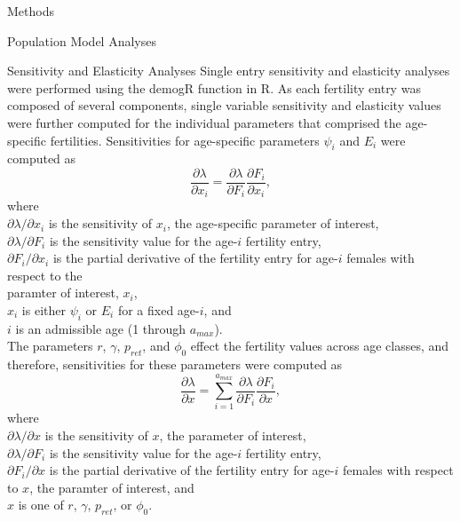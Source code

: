 \documentclass[12pt]{article}
\begin{document}
\begin{section}{Methods}
\begin{subsection}{Population Model Analyses}
\begin{subsubsection}{Sensitivity and Elasticity Analyses} 
Single entry sensitivity and elasticity analyses were performed using the demogR function in R.  As each fertility entry was composed of several components, single variable sensitivity and elasticity values were further computed for the individual parameters that comprised the age-specific fertilities.  Sensitivities for age-specific parameters $\psi_i$ and $E_i$ were computed as
\begin{equation}
\frac{\partial\lambda}{\partial x_i}=\frac{\partial\lambda}{\partial F_i}\frac{\partial F_i}{\partial x_i},
\end{equation} 
where\\
\hspace*{0.5cm}$\partial\lambda/\partial x_i$ is the sensitivity of $x_i$, the age-specific parameter of interest,\\
\hspace*{0.5cm}$\partial\lambda/\partial F_i$ is the sensitivity value for the age-$i$ fertility entry,\\
\hspace*{0.5cm}$\partial F_i/\partial x_i$ is the partial derivative of the fertility entry for age-$i$ females with respect to the\\ 
\hspace*{1.5cm}paramter of interest, $x_i$,\\
\hspace*{0.5cm}$x_i$ is either $\psi_i$ or $E_i$ for a fixed age-$i$, and\\
\hspace*{0.5cm}$i$ is an admissible age (1 through $a_{max}$).\\
 
The parameters $r$, $\gamma$, $p_{ret}$, and $\phi_0$ effect the fertility values across age classes, and therefore, sensitivities for these parameters were computed as
\begin{equation}
\frac{\partial\lambda}{\partial x}=\sum_{i=1}^{a_{max}}\frac{\partial\lambda}{\partial F_i}\frac{\partial F_i}{\partial x},
\end{equation} 
where\\
\hspace*{0.5cm}$\partial\lambda/\partial x$ is the sensitivity of $x$, the parameter of interest,\\
\hspace*{0.5cm}$\partial\lambda/\partial F_i$ is the sensitivity value for the age-$i$ fertility entry,\\
\hspace*{0.5cm}$\partial F_i/\partial x$ is the partial derivative of the fertility entry for age-$i$ females with respect to $x$, 
\hspace*{1.5cm}the paramter of interest, and\\
\hspace*{0.5cm}$x$ is one of $r$, $\gamma$, $p_{ret}$, or $\phi_0$.\\


\end{subsubsection}
\end{subsection}
\end{section}
\end{document}
